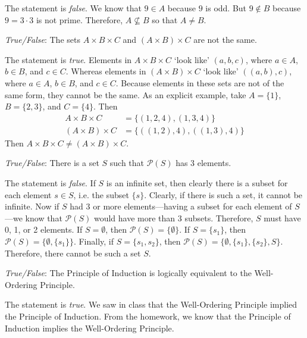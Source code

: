 \documentclass[11pt,letterpaper]{article}
\begin{document}
\sol The statement is \textit{false}. We know that $9 \in A$ because $9$ is odd. But $9 \notin B$ because $9= 3 \cdot 3$ is not prime. Therefore, $A \not\subseteq B$ so that $A \neq B$. \pvspace{1.5cm}



\quizsol \textit{True/False}: The sets $A \times B \times C$ and $(A \times B) \times C$ are not the same. \pspace

\sol The statement is \textit{true}. Elements in $A \times B \times C$ `look like' $(a, b, c)$, where $a \in A$, $b \in B$, and $c \in C$. Whereas elements in $(A \times B) \times C$ `look like' $((a, b), c)$, where $a \in A$, $b \in B$, and $c \in C$. Because elements in these sets are not of the same form, they cannot be the same. As an explicit example, take $A= \{ 1 \}$, $B= \{ 2, 3 \}$, and $C= \{ 4 \}$. Then 
	\[
	\begin{aligned}
	A \times B \times C&= \{ (1, 2, 4), (1, 3, 4) \} \\
	(A \times B) \times C&= \{ ((1, 2), 4), ((1, 3), 4) \}
	\end{aligned}
	\]
Then $A \times B \times C \neq (A \times B) \times C$. 



\newpage



\quizsol \textit{True/False}: There is a set $S$ such that $\mathcal{P}(S)$ has 3 elements. \pspace

\sol The statement is \textit{false}. If $S$ is an infinite set, then clearly there is a subset for each element $s \in S$, i.e. the subset $\{ s \}$. Clearly, if there is such a set, it cannot be infinite. Now if $S$ had 3 or more elements---having a subset for each element of $S$---we know that $\mathcal{P}(S)$ would have more than 3 subsets. Therefore, $S$ must have 0, 1, or 2 elements. If $S= \emptyset$, then $\mathcal{P}(S)= \{ \emptyset \}$. If $S= \{ s_1 \}$, then $\mathcal{P}(S)= \{ \emptyset, \{ s_1 \} \}$. Finally, if $S= \{ s_1, s_2 \}$, then $\mathcal{P}(S)= \{ \emptyset, \{ s_1 \}, \{ s_2 \}, S \}$. Therefore, there cannot be such a set $S$. \pvspace{1.5cm}



\quizsol \textit{True/False}: The Principle of Induction is logically equivalent to the Well-Ordering Principle. \pspace

\sol The statement is \textit{true}. We saw in class that the Well-Ordering Principle implied the Principle of Induction. From the homework, we know that the Principle of Induction implies the Well-Ordering Principle. 
\end{document}
